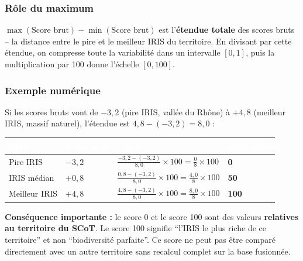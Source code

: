 \documentclass[12pt,a4paper]{report}
\begin{document}
\subsubsection*{Rôle du maximum}

$\max(\text{Score brut}) - \min(\text{Score brut})$ est l'\textbf{étendue totale} des scores bruts -- la distance entre le pire et le meilleur IRIS du territoire. En divisant par cette étendue, on compresse toute la variabilité dans un intervalle $[0, 1]$, puis la multiplication par 100 donne l'échelle $[0, 100]$.

\subsubsection*{Exemple numérique}

Si les scores bruts vont de $-3{,}2$ (pire IRIS, vallée du Rhône) à $+4{,}8$ (meilleur IRIS, massif naturel), l'étendue est $4{,}8 - (-3{,}2) = 8{,}0$ :

\vspace{0.3cm}
\begin{tabularx}{\textwidth}{L{2.5cm} L{1.8cm} X L{2cm}}
  \toprule
  \textcolor{white}{\textbf{IRIS}} &
  \textcolor{white}{\textbf{Score brut}} &
  \textcolor{white}{\textbf{Calcul}} &
  \textcolor{white}{\textbf{Score final}} \\
  \midrule
  Pire IRIS & $-3{,}2$ & $\frac{-3{,}2 - (-3{,}2)}{8{,}0} \times 100 = \frac{0}{8} \times 100$ & \textbf{0} \\
  IRIS médian & $+0{,}8$ & $\frac{0{,}8 - (-3{,}2)}{8{,}0} \times 100 = \frac{4{,}0}{8} \times 100$ & \textbf{50} \\
  Meilleur IRIS & $+4{,}8$ & $\frac{4{,}8 - (-3{,}2)}{8{,}0} \times 100 = \frac{8{,}0}{8} \times 100$ & \textbf{100} \\
  \bottomrule
\end{tabularx}

\vspace{0.4cm}
\begin{tcolorbox}[infobox]
  \textbf{Conséquence importante :} le score 0 et le score 100 sont des valeurs \textbf{relatives au territoire du SCoT}. Le score 100 signifie ``l'IRIS le plus riche de ce territoire'' et non ``biodiversité parfaite''. Ce score ne peut pas être comparé directement avec un autre territoire sans recalcul complet sur la base fusionnée.
\end{tcolorbox}

\end{document}

